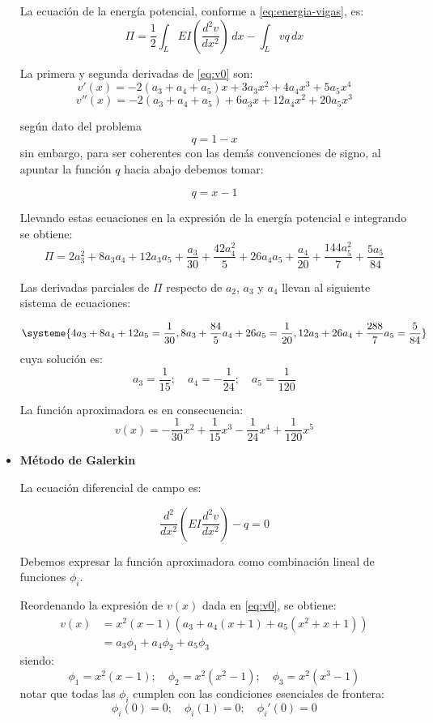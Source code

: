 \begin{example}
\begin{itemize}
	La ecuación de la energía potencial, conforme a \eqref{eq:energia-vigas}, es:
	\[ \Pi = \frac{1}{2} \int_L EI \left( \frac{d^2v}{dx^2} \right) \, dx - \int_L v q \, dx \]
	
	La primera y segunda derivadas de \eqref{eq:v0} son:
	\[ v'(x) = -2 \left(a_{3} + a_{4} + a_{5}\right) x + 3 a_{3} x^{2} + 4 a_{4} x^{3} + 5 a_{5} x^{4} \]
	\[ v''(x) = -2 \left(a_{3} + a_{4} + a_{5}\right) + 6 a_{3} x + 12 a_{4} x^{2} + 20 a_{5} x^{3} \]
	
	según dato del problema \[ q = 1 - x \]
	sin embargo, para ser coherentes con las demás convenciones de signo, al apuntar la
	función $q$ hacia abajo debemos tomar:

	\[q = x - 1\]
	
	Llevando estas ecuaciones en la expresión de la energía potencial e integrando se obtiene:
	\[ \Pi = 2 a_{3}^{2} + 8 a_{3} a_{4} + 12 a_{3} a_{5} + \frac{a_{3}}{30} + \frac{42 a_{4}^{2}}{5} + 26 a_{4} a_{5} + \frac{a_{4}}{20} + \frac{144 a_{5}^{2}}{7} + \frac{5 a_{5}}{84}\]
	
	Las derivadas parciales de $\Pi$ respecto de $a_2$, $a_3$ y $a_4$ llevan al siguiente sistema de ecuaciones:
	
	\[\systeme{4 a_{3} + 8 a_{4} + 12 a_{5} = \frac{1}{30}, 
	8 a_{3} + \frac{84}{5} a_{4} + 26 a_{5} = \frac{1}{20},
	12 a_{3} + 26 a_{4} + \frac{288}{7}a_{5} = \frac{5}{84}}
	\]
	cuya solución es:
	\[ a_3 = \frac{1}{15}; \quad a_4 = -\frac{1}{24}; \quad a_5 = \frac{1}{120} \]
	
	La función aproximadora es en consecuencia:
	\[ v(x) = -\frac{1}{30}x^2 + \frac{1}{15}x^3 - \frac{1}{24}x^4 + \frac{1}{120}x^5 \]
	
	\item \textbf{Método de Galerkin}
	
	La ecuación diferencial de campo es:

	\[ \frac{d^2}{dx^2} \left( EI \frac{d^2v}{dx^2} \right) - q = 0 \]


	Debemos expresar la función aproximadora como combinación lineal de funciones $\phi_i$.
	
	Reordenando la expresión de $v(x)$ dada en \eqref{eq:v0}, se obtiene:
	\[ \begin{split}
		v(x) &= x^{2} \left(x - 1\right) \left(a_{3} + a_{4} \left(x + 1\right) + a_{5} \left(x^{2} + x + 1\right)\right) \\
		&= a_3\phi_1 + a_4\phi_2 + a_5 \phi_3
	\end{split} \]
	siendo:
	\[ \phi_1 = x^2(x-1); \quad \phi_2 = x^2 (x^2 -1); \quad \phi_3 = x^2(x^3-1) \]
	notar que todas las $\phi_i$ cumplen con las condiciones esenciales de frontera:
	\[ \phi_i(0) = 0; \quad \phi_i(1) = 0; \quad \phi_i'(0) = 0 \]
	

\end{itemize}
\end{example}
